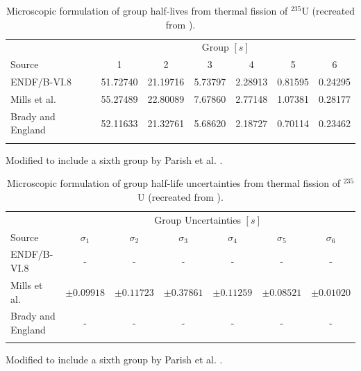 \begin{table}[!h]
\centering
\begin{threeparttable}
\caption{Microscopic formulation of group half-lives from thermal fission of $^{235}$U (recreated from \cite{parish1999status}).}
\begin{tabular}{lcccccc}
\hline
 & \multicolumn{6}{c}{Group $[s]$} \\
Source & 1 & 2 & 3 & 4 & 5 & 6 \\
\hline
ENDF/B-VI.8 \cite{endf6}   & 51.72740 & 21.19716 & 5.73797 & 2.28913 & 0.81595 & 0.24295 \\
Mills et al. \cite{mills1991study}    & 55.27489 & 22.80089 & 7.67860 & 2.77148 & 1.07381 & 0.28177\\
Brady and England \cite{brady1989delayed} & 52.11633 & 21.32761 & 5.68620 & 2.18727 & 0.70114 & 0.23462 \\
\hline
\label{tab:micro-half-lives}
\end{tabular}
\begin{tablenotes}
\item[*] Modified to include a sixth group by Parish et al. \cite{parish1999status}.
\end{tablenotes}
\end{threeparttable}
\end{table}

\begin{table}[!h]
\centering
\begin{threeparttable}
\caption{Microscopic formulation of group half-life uncertainties from thermal fission of $^{235}$U (recreated from \cite{parish1999status}).}
\begin{tabular}{lcccccc}
\hline
 & \multicolumn{6}{c}{Group Uncertainties $[s]$} \\
Source & $\sigma_1$ & $\sigma_2$ & $\sigma_3$ & $\sigma_4$ & $\sigma_5$ & $\sigma_6$ \\
\hline
ENDF/B-VI.8 \cite{endf6}   & - & - & - & - & - & - \\
Mills et al. \cite{mills1991study}    & $\pm0.09918$ & $\pm0.11723$ & $\pm0.37861$ & $\pm0.11259$ & $\pm0.08521$ & $\pm0.01020$ \\
Brady and England \cite{brady1989delayed} & - & - & - & - & - & - \\
\hline
\label{tab:micro-half-lives-delta}
\end{tabular}
\begin{tablenotes}
\item[*] Modified to include a sixth group by Parish et al. \cite{parish1999status}.
\end{tablenotes}
\end{threeparttable}
\end{table}


